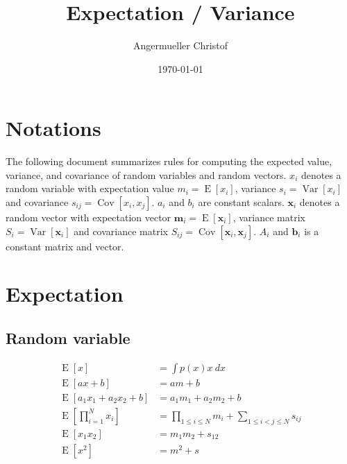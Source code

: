 \documentclass[a4paper]{article}
\author{Angermueller Christof}
\date{\today}
\title{Expectation / Variance}
\begin{document}
\newcommand{\bs}{\boldsymbol}
\newcommand{\Exp}[1]{\operatorname{E}[#1]}
\newcommand{\Var}[1]{\operatorname{Var}[#1]}
\newcommand{\Cov}[1]{\operatorname{Cov}[#1]}
\newcommand{\Tr}[1]{\operatorname{Tr}[#1]}
\maketitle
\tableofcontents
\section{Notations}
The following document summarizes rules for computing the expected value, variance, and covariance of random variables and random vectors.
$x_i$ denotes a random variable with expectation value $m_i=\Exp{x_i}$, variance $s_i=\Var{x_i}$ and covariance $s_{ij}=\Cov{x_i, x_j}$. $a_i$ and $b_i$ are constant scalars.
$\bs{x}_i$ denotes a random vector with expectation vector $\bs{m}_i=\Exp{\bs{x}_i}$, variance matrix $S_i=\Var{\bs{x}_i}$ and covariance matrix $S_{ij}=\Cov{\bs{x}_i, \bs{x}_j}$. $A_i$ and $\bs{b}_i$ is a constant matrix and vector.
\newpage

\section{Expectation}
\subsection{Random variable}
\begin{align*}
  \Exp{x} &= \int p(x) x \: dx \\
  \Exp{ax + b} &= am + b \\
  \Exp{a_1 x_1 + a_2 x_2 + b} &= a_1 m_1 + a_2 m_2 + b \\
  \Exp{\prod_{i=1}^N x_i} &= \prod_{1 \le i \le N} m_i + \sum_{1 \le i < j \le N} s_{ij} \\
  \Exp{x_1x_2} &= m_1m_2 + s_{12} \\
  \Exp{x^2} &= m^2 + s
\end{align*}
\end{document}
